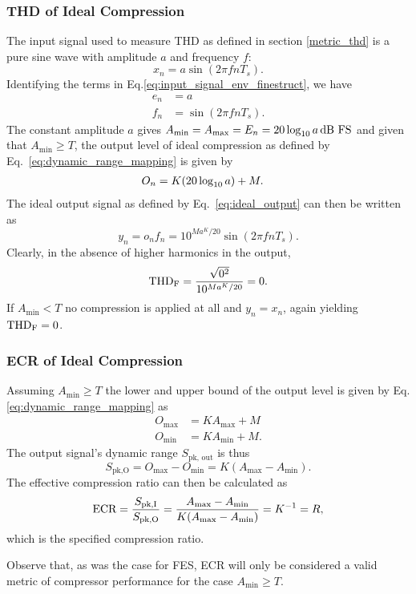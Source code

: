 \documentclass[../main2.tex]{subfiles}
\begin{document}
\subsubsection{THD of Ideal Compression}
The input signal used to measure THD as defined in section \ref{metric_thd} is a pure sine wave with amplitude $a$ and frequency $f$:
\begin{equation}
x_n = a \sin( 2 \pi f n T_s ).
\end{equation}
Identifying the terms in Eq.\eqref{eq:input_signal_env_finestruct}, we have
\begin{equation}
\begin{split}
e_n &= a \\
f_n &= \sin( 2 \pi f n T_s ).
\end{split}
\end{equation}
The constant amplitude $a$ gives $A_\text{min} = A_\text{max} = E_n = 20 \log_{10} a \mskip3mu\text{dB~FS}$ and given that $A_\text{min} \geq T$, the output level of ideal compression as defined by Eq.~\eqref{eq:dynamic_range_mapping} is given by
\begin{equation}
\begin{split}
O_n &= K (20 \log_{10} a) + M.
\end{split}
\end{equation}
The ideal output signal as defined by Eq.~\eqref{eq:ideal_output} can then be written as
\begin{equation}
y_n = o_n f_n = 10^{Ma^K/20} \sin(2 \pi f n T_s).
\end{equation}
Clearly, in the absence of higher harmonics in the output,
\begin{equation}
\text{THD}_\text{F} = \frac{\sqrt{0^2}}{10^{Ma^K/20}} = 0.
\end{equation}
If $A_\text{min} < T$ no compression is applied at all and $y_n = x_n$, again yielding $\text{THD}_\text{F} = 0$.

\subsubsection{ECR of Ideal Compression}
Assuming $A_\text{min} \geq T$ the lower and upper bound of the output level is given by Eq.\eqref{eq:dynamic_range_mapping} as
\begin{equation}
\begin{split}
O_\text{max} &= K A_\text{max} + M\\
O_\text{min} &= K A_\text{min} + M.
\end{split}
\end{equation}
The output signal's dynamic range $S_\text{pk, out}$ is thus
\begin{equation}
S_\text{pk,O} = O_\text{max} - O_\text{min} = K (A_\text{max} - A_\text{min}).\end{equation}
The effective compression ratio can then be calculated as
\begin{equation}
\text{ECR} = \frac{S_\text{pk,I}}{S_\text{pk,O}} = \frac{A_\text{max} - A_\text{min}}{K(A_\text{max} - A_\text{min})} = K^{-1} = R,
\end{equation}
which is the specified compression ratio.

Observe that, as was the case for FES, ECR will only be considered a valid metric of compressor performance for the case $A_\text{min} \geq T$.
\end{document}
